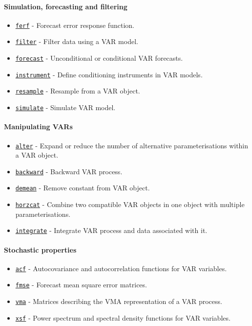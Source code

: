  \paragraph{Simulation, forecasting and filtering}
 
 \begin{itemize}
 \item
   \href{VAR/ferf}{\texttt{ferf}} - Forecast error response function.
 \item
   \href{VAR/filter}{\texttt{filter}} - Filter data using a VAR model.
 \item
   \href{VAR/forecast}{\texttt{forecast}} - Unconditional or conditional
   VAR forecasts.
 \item
   \href{VAR/instrument}{\texttt{instrument}} - Define conditioning
   instruments in VAR models.
 \item
   \href{VAR/resample}{\texttt{resample}} - Resample from a VAR object.
 \item
   \href{VAR/simulate}{\texttt{simulate}} - Simulate VAR model.
 \end{itemize}
 
 \paragraph{Manipulating VARs}
 
 \begin{itemize}
 \item
   \href{VAR/alter}{\texttt{alter}} - Expand or reduce the number of
   alternative parameterisations within a VAR object.
 \item
   \href{VAR/backward}{\texttt{backward}} - Backward VAR process.
 \item
   \href{VAR/demean}{\texttt{demean}} - Remove constant from VAR object.
 \item
   \href{VAR/horzcat}{\texttt{horzcat}} - Combine two compatible VAR
   objects in one object with multiple parameterisations.
 \item
   \href{VAR/integrate}{\texttt{integrate}} - Integrate VAR process and
   data associated with it.
 \end{itemize}
 
 \paragraph{Stochastic properties}
 
 \begin{itemize}
 \item
   \href{VAR/acf}{\texttt{acf}} - Autocovariance and autocorrelation
   functions for VAR variables.
 \item
   \href{VAR/fmse}{\texttt{fmse}} - Forecast mean square error matrices.
 \item
   \href{VAR/vma}{\texttt{vma}} - Matrices describing the VMA
   representation of a VAR process.
 \item
   \href{VAR/xsf}{\texttt{xsf}} - Power spectrum and spectral density
   functions for VAR variables.
 \end{itemize}
 
